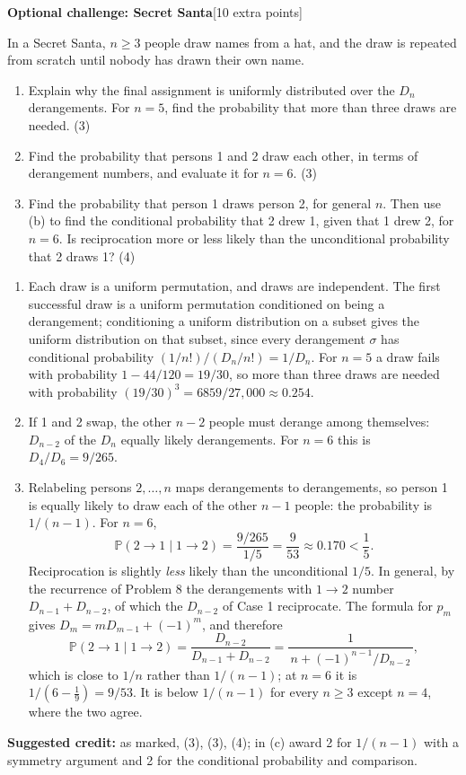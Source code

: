 \documentclass[11pt,letterpaper]{article}
\renewcommand{\P}{\mathbb P}
\newcommand{\pts}[1]{\hfill\textcolor{muted}{\small[#1 points]}}
\newcommand{\partpts}[1]{\unskip\nobreak\hspace{.3em}\mbox{\textcolor{muted}{\small(#1)}}}
\begin{document}
\par\addvspace{12pt}
{\bfseries\color{mint}Optional challenge: Secret Santa}\pts{10 extra}

In a Secret Santa, $n\ge3$ people draw names from a hat, and the draw is
repeated from scratch until nobody has drawn their own name.
\begin{enumerate}
 \item Explain why the final assignment is uniformly distributed over
 the $D_n$ derangements. For $n=5$, find the probability that more than
 three draws are needed. \partpts{3}
 \item Find the probability that persons 1 and 2 draw each other, in terms
 of derangement numbers, and evaluate it for $n=6$. \partpts{3}
 \item Find the probability that person 1 draws person 2, for general $n$.
 Then use (b) to find the conditional probability that 2 drew 1, given
 that 1 drew 2, for $n=6$. Is reciprocation more or less likely than the
 unconditional probability that 2 draws 1? \partpts{4}
\end{enumerate}
\begin{solution}
\begin{enumerate}
 \item Each draw is a uniform permutation, and draws are independent. The
 first successful draw is a uniform permutation conditioned on being a
 derangement; conditioning a uniform distribution on a subset gives the
 uniform distribution on that subset, since every derangement $\sigma$ has
 conditional probability $(1/n!)/(D_n/n!)=1/D_n$. For $n=5$ a draw fails
 with probability $1-44/120=19/30$, so more than three draws are needed
 with probability $(19/30)^3=6859/27{,}000\approx0.254$.
 \item If 1 and 2 swap, the other $n-2$ people must derange among
 themselves: $D_{n-2}$ of the $D_n$ equally likely derangements. For
 $n=6$ this is $D_4/D_6=9/265$.
 \item Relabeling persons $2,\ldots,n$ maps derangements to derangements,
 so person 1 is equally likely to draw each of the other $n-1$ people:
 the probability is $1/(n-1)$. For $n=6$,
 \[
 \P(2\to1\mid1\to2)=\frac{9/265}{1/5}=\frac{9}{53}\approx0.170
 <\frac15 .
 \]
 Reciprocation is slightly \emph{less} likely than the unconditional $1/5$.
 In general, by the recurrence of Problem 8 the derangements with $1\to2$
 number $D_{n-1}+D_{n-2}$, of which the $D_{n-2}$ of Case 1 reciprocate.
 The formula for $p_m$ gives $D_m=mD_{m-1}+(-1)^m$, and therefore
 \[
 \P(2\to1\mid1\to2)=\frac{D_{n-2}}{D_{n-1}+D_{n-2}}
 =\frac1{\,n+(-1)^{n-1}/D_{n-2}\,},
 \]
 which is close to $1/n$ rather than $1/(n-1)$; at $n=6$ it is
 $1/(6-\frac19)=9/53$. It is below $1/(n-1)$ for every $n\ge3$ except
 $n=4$, where the two agree.
\end{enumerate}
\textbf{Suggested credit:} as marked, (3), (3), (4); in (c) award 2 for
$1/(n-1)$ with a symmetry argument and 2 for the conditional probability
and comparison.
\end{solution}
\end{document}
